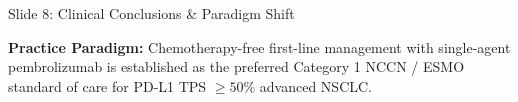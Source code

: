 \documentclass[aspectratio=169,10pt]{beamer}
\begin{document}
\begin{frame}{Slide 8: Clinical Conclusions \& Paradigm Shift}
\vspace{3pt}

\begin{calloutcard}
  \centering\scriptsize\color{DeepNavy}
  \textbf{Practice Paradigm:} Chemotherapy-free first-line management with single-agent pembrolizumab is established as the preferred Category 1 NCCN / ESMO standard of care for PD-L1 TPS $\ge 50\%$ advanced NSCLC.
\end{calloutcard}
\end{frame}
\end{document}
